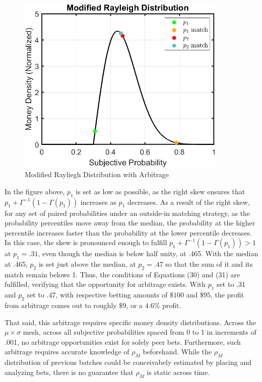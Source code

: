 \documentclass[sn-mathphys-num]{sn-jnl}
\theoremstyle{thmstyleone}%
\theoremstyle{thmstyletwo}%
\theoremstyle{thmstylethree}%
\begin{document}
\begin{figure}[H]
	\centering
	\includegraphics[width=10cm]{Rayleigh Distribution}
	\caption{Modified Rayliegh Distribution with Arbitrage}
\end{figure}

In the figure above, $p_1$ is set as low as possible, as the right skew ensures that $p_1 + \Gamma^{-1}(1-\Gamma(p_1))$ increases as $p_1$ decreases. As a result of the right skew, for any set of paired probabilities under an outside-in matching strategy, as the probability percentiles move away from the median, the probability at the higher percentile increases faster than the probability at the lower percentile decreases. In this case, the skew is pronounced enough to fulfill $p_1 + \Gamma^{-1}(1-\Gamma(p_1)) > 1$ at $p_1 = .31$, even though the median is below half unity, at .465. With the median at .465, $p_2$ is set just above the median, at $p_2 = .47$ so that the sum of it and its match remain belows 1. Thus, the conditions of Equations (30) and (31) are fulfilled, verifying that the opportunity for arbitrage exists. With $p_1$ set to .31 and $p_2$ set to .47, with respective betting amounts of $\$100$ and $\$95$, the profit from arbitrage comes out to roughly $\$9$, or a $4.6\%$ profit. 

That said, this arbitrage requires specific money density distributions. Across the $\mu \times \sigma$ mesh, across all subjective probabilities spaced from 0 to 1 in increments of .001, no arbitrage opportunities exist for solely peer bets. Furthermore, such arbitrage requires accurate knowledge of $\rho_M$ beforehand. While the $\rho_M$ distribution of previous batches could be conceivabely estimated by placing and analyzing bets, there is no guarantee that $\rho_M$ is static across time.
\end{document}

